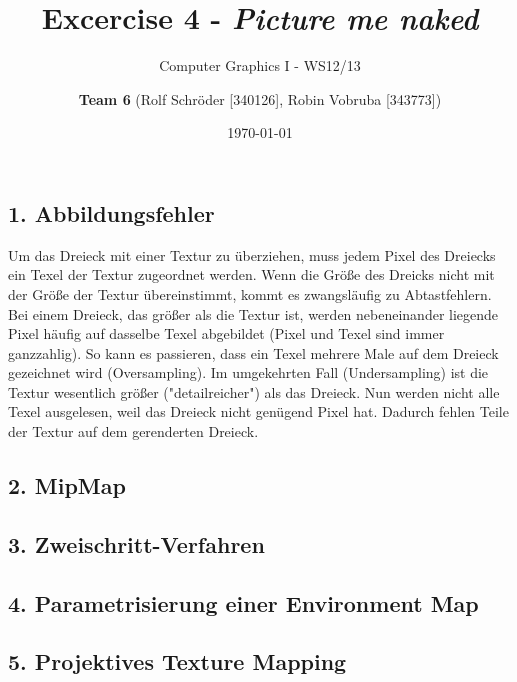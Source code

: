 \documentclass[a4paper,headings=small]{scrartcl}
\title{Excercise 4 - \emph{Picture me naked}}
\subtitle{Computer Graphics I - WS12/13}
\author{\textbf{Team 6} (Rolf Schröder [340126], Robin Vobruba [343773])}
\date{\today}
\numberwithin{equation}{section} %
\numberwithin{figure}{section}   %
\begin{document}
\maketitle

\subsection*{1. Abbildungsfehler}
Um das Dreieck mit einer Textur zu überziehen, muss jedem Pixel des Dreiecks ein Texel der Textur zugeordnet werden.
Wenn die Größe des Dreicks nicht mit der Größe der Textur übereinstimmt, kommt es zwangsläufig zu Abtastfehlern.
Bei einem Dreieck, das größer als die Textur ist, werden nebeneinander liegende Pixel häufig auf dasselbe Texel abgebildet (Pixel und Texel sind immer ganzzahlig).
So kann es passieren, dass ein Texel mehrere Male auf dem Dreieck gezeichnet wird (Oversampling).
Im umgekehrten Fall (Undersampling) ist die Textur wesentlich größer ("detailreicher") als das Dreieck.
Nun werden nicht alle Texel ausgelesen, weil das Dreieck nicht genügend Pixel hat.
Dadurch fehlen Teile der Textur auf dem gerenderten Dreieck.

\subsection*{2. MipMap}

\subsection*{3. Zweischritt-Verfahren}

\subsection*{4. Parametrisierung einer Environment Map}

\subsection*{5. Projektives Texture Mapping}
\end{document}
